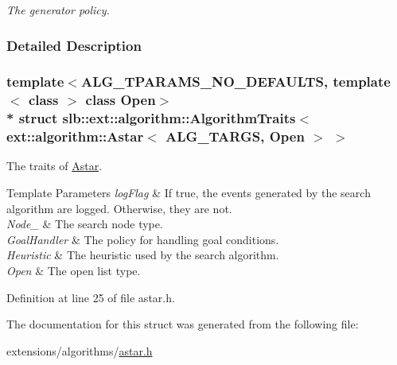 \begin{DoxyCompactItemize}
\begin{DoxyCompactList}\small\item\em The generator policy. \end{DoxyCompactList}\end{DoxyCompactItemize}


\subsubsection{Detailed Description}
\subsubsection*{template$<$A\+L\+G\+\_\+\+T\+P\+A\+R\+A\+M\+S\+\_\+\+N\+O\+\_\+\+D\+E\+F\+A\+U\+L\+TS, template$<$ class $>$ class Open$>$\\*
struct slb\+::ext\+::algorithm\+::\+Algorithm\+Traits$<$ ext\+::algorithm\+::\+Astar$<$ A\+L\+G\+\_\+\+T\+A\+R\+G\+S, Open $>$ $>$}

The traits of \hyperlink{structslb_1_1ext_1_1algorithm_1_1Astar}{Astar}. 


\begin{DoxyTemplParams}{Template Parameters}
{\em log\+Flag} & If {\ttfamily true}, the events generated by the search algorithm are logged. Otherwise, they are not. \\
\hline
{\em Node\+\_\+} & The search node type. \\
\hline
{\em Goal\+Handler} & The policy for handling goal conditions. \\
\hline
{\em Heuristic} & The heuristic used by the search algorithm. \\
\hline
{\em Open} & The open list type. \\
\hline
\end{DoxyTemplParams}


Definition at line 25 of file astar.\+h.



The documentation for this struct was generated from the following file\+:\begin{DoxyCompactItemize}
\item 
extensions/algorithms/\hyperlink{astar_8h}{astar.\+h}\end{DoxyCompactItemize}
